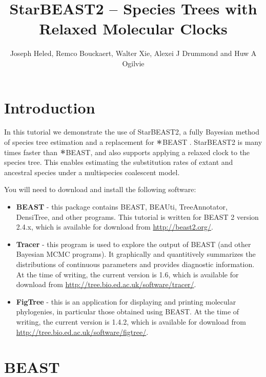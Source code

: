 \documentclass{article}
\newcommand{\BEASTVersion}{2.4.x}
\newcommand{\TracerVersion}{1.6}
\newcommand{\FigTreeVersion}{1.4.2}
\newcommand{\Conv}{\mathop{\scalebox{1.5}{$\ast$}}}
\begin{document}
\title{StarBEAST2 -- Species Trees with Relaxed Molecular Clocks}

\author{Joseph Heled, Remco Bouckaert, Walter Xie, Alexei J Drummond and Huw A Ogilvie}

\maketitle

\section{Introduction}

In this tutorial we demonstrate the use of StarBEAST2, a fully Bayesian method
of species tree estimation and a replacement for $\Conv$BEAST
\citep{Heled01032010}. StarBEAST2 is many times faster than $\Conv$BEAST,
and also supports applying a relaxed clock to the species tree. This enables
estimating the substitution rates of extant and ancestral species under a
multispecies coalescent model.

You will need to download and install the following software:

\begin{itemize}
\item \textbf{BEAST} - this package contains BEAST, BEAUti,
TreeAnnotator, DensiTree, and other programs. This tutorial is written
for BEAST 2 \citep{10.1371/journal.pcbi.1003537} version {\BEASTVersion}, which is available for download from
\url{http://beast2.org/}.
\item \textbf{Tracer} - this program is used to explore the output of BEAST (and
other Bayesian MCMC programs). It graphically and quantitively summarizes the
distributions of continuous parameters and provides diagnostic information. At
the time of writing, the current version is {\TracerVersion}, which is available
for download from \url{http://tree.bio.ed.ac.uk/software/tracer/}.
\item \textbf{FigTree} - this is an application for displaying and printing
molecular phylogenies, in particular those obtained using BEAST. At the time of
writing, the current version is {\FigTreeVersion}, which is available for download
from \url{http://tree.bio.ed.ac.uk/software/figtree/}.
\end{itemize}

\section{BEAST}
\end{document}
